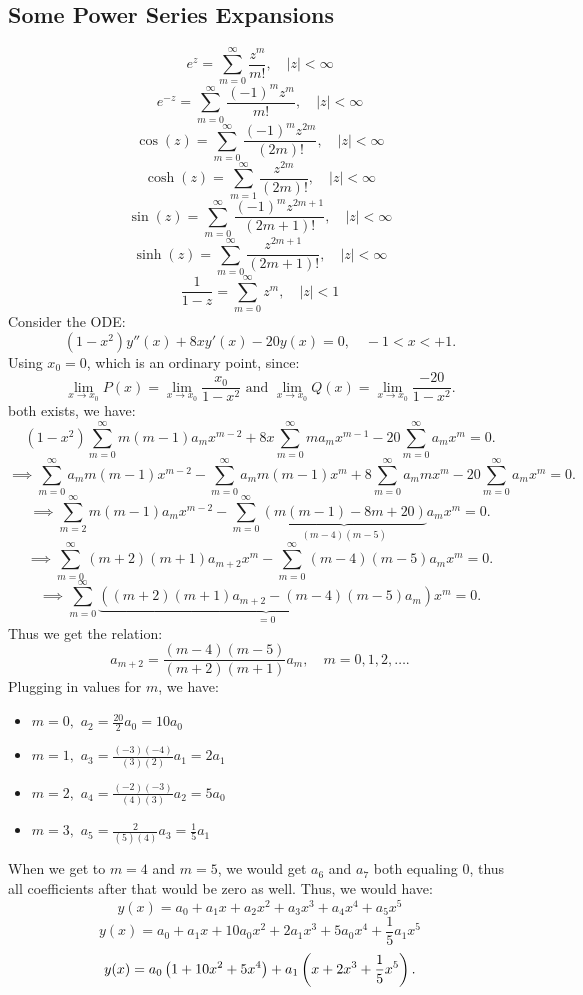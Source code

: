 \documentclass[../main/main.tex]{subfiles}
\begin{document}
\subsection{Some Power Series Expansions}
  \[
	  e^{z}= \sum_{m=0}^{\infty} \frac{z^{m}}{m!},\quad |z|<\infty
  \]
 \[
		  e^{-z}= \sum_{m=0}^{\infty} \frac{(-1)^{m}z^{m}}{m!},\quad |z| < \infty
	  \]
 \[
		  \cos(z) = \sum_{m=0}^{\infty} \frac{(-1)^{m}z^{2m}}{(2m)!},\quad |z|< \infty
	  \]
 \[
		  \cosh(z) = \sum_{m=1}^{\infty} \frac{z^{2m}}{(2m)!},\quad |z|<\infty
	  \]
 \[
		  \sin(z) = \sum_{m=0}^{\infty} \frac{(-1)^{m}z^{2m+1}}{(2m+1)!},\quad |z| < \infty
	  \]
 \[
		  \sinh(z) = \sum_{m=0}^{\infty} \frac{z^{2m+1}}{(2m+1)!},\quad |z| < \infty
	  \]
 \[
	  \frac{1}{1-z}= \sum_{m=0}^{\infty} z^{m}, \quad |z|<1
  \]
	Consider the ODE: \[
		(1-x^2)y''(x) + 8xy'(x) -20y(x) = 0, \quad -1<x<+1
	.\] Using $x_0=0$, which is an ordinary point, since: \[
	\lim\limits_{x \to x_0} P(x)= \lim\limits_{x \to x_0} \frac{x_0}{1-x^2} \text{ and }\lim\limits_{x \to x_0} Q(x) = \lim\limits_{x \to x_0} \frac{-20}{1-x^2}
	.\] both exists, we have: \[
	(1-x^2) \sum_{m=0}^{\infty} m(m-1)a_mx^{m-2}+8x \sum_{m=0}^{\infty} ma_mx^{m-1}-20 \sum_{m=0}^{\infty} a_mx^{m}=0
	.\] \[
	\implies \sum_{m=0}^{\infty} a_m m(m-1) x^{m-2}- \sum_{m=0}^{\infty} a_m m(m-1) x^{m}+ 8 \sum_{m=0}^{\infty} a_m mx^{m} -20 \sum_{m=0}^{\infty} a_mx^{m}=0
	.\] \[
	\implies \sum_{m=2}^{\infty} m(m-1)a_mx^{m-2}-\sum_{m=0}^{\infty} \underbrace{\left( m(m-1)-8m+20 \right)}_{(m-4)(m-5)} a_mx^{m}=0
	.\]\[
	\implies \sum_{m=0}^{\infty} (m+2)(m+1) a_{m+2}x^{m}-\sum_{m=0}^{\infty} (m-4)(m-5)a_{m}x^{m}=0
	.\]  \[
	\implies \sum_{m=0}^{\infty} \underbrace{\left( (m+2)(m+1)a_{m+2}-(m-4)(m-5)a_{m} \right)}_{=0} x^{m}=0
	.\] Thus we get the relation: \[
	a_{m+2} = \frac{(m-4)(m-5)}{(m+2)(m+1)}a_m, \quad m=0,1,2,\ldots
	.\] 
	Plugging in values for $m$, we have: 
	\begin{itemize}
		\item $m=0,$ $a_2 = \frac{20}{2}a_0=10a_0$
		\item $m=1,$ $a_3 = \frac{(-3)(-4)}{(3)(2)}a_1=2a_1$
		\item $m=2,$ $a_4 = \frac{(-2)(-3)}{(4)(3)}a_2=5 a_0$
		\item $m=3,$ $a_5 = \frac{2}{(5)(4)}a_3=\frac{1}{5}a_1$
	\end{itemize}
	When we get to $m=4$ and $m=5$, we would get $a_6$ and  $a_7$ both equaling 0, thus all coefficients after that would be zero as well. Thus, we would have: \[
		y(x) = a_0+a_1x + a_2x^2+a_3x^{3}+a_4x^{4}+a_5x^{5}
	\] \[
	y(x) = a_0+a_1x+10a_0x^2+2a_1x^{3}+5a_0x^{4}+\frac{1}{5}a_1x^{5}
	\] \[
	y(x) = a_0\large\left( 1+10x^2+5x^{4} \large\right) +a_1\left( x+2x^{3}+\frac{1}{5}x^{5} \right) 
	.\] 
\end{document}
